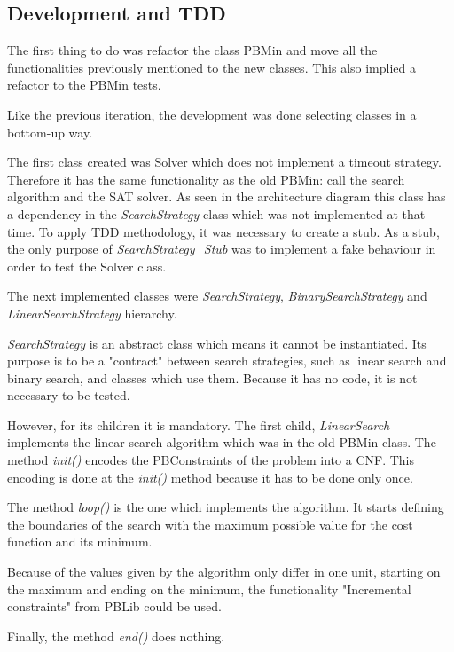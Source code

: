 \subsection{Development and TDD}
The first thing to do was refactor the class PBMin and move all the functionalities previously mentioned to the new classes. This also implied a refactor to the PBMin tests.  



Like the previous iteration, the development was done selecting classes in a bottom-up way.  



The first class created was Solver which does not implement a timeout strategy. Therefore it has the same functionality as the old PBMin: call the search algorithm and the SAT solver. As seen in the architecture diagram 
this class has a dependency in the \emph{SearchStrategy} class which was not implemented at that time. To apply TDD methodology, it was necessary to create a stub. As a stub, the only purpose of \emph{SearchStrategy\_Stub} was to implement a fake behaviour in order to test the Solver class. 

The next implemented classes were \emph{SearchStrategy}, \emph{BinarySearchStrategy} and \emph{LinearSearchStrategy} hierarchy.  

\emph{SearchStrategy} is an abstract class which means it cannot be instantiated. Its purpose is to be a "contract" between search strategies, such as linear search and binary search, and classes which use them. Because it has no code, it is not necessary to be tested.  



However, for its children it is mandatory. The first child, \emph{LinearSearch} implements the linear search algorithm which was in the old PBMin class. The method \emph{init()} encodes the PBConstraints of the problem into a CNF. This encoding is done at the \emph{init()} method because it has to be done only once.  

The method \emph{loop()} is the one which implements the algorithm. It starts defining the boundaries of the search with the maximum possible value for the cost function and its minimum.  

Because of the values given by the algorithm only differ in one unit, starting on the maximum and ending on the minimum, the functionality "Incremental constraints" from PBLib could be used. %

Finally, the method \emph{end()} does nothing. 



